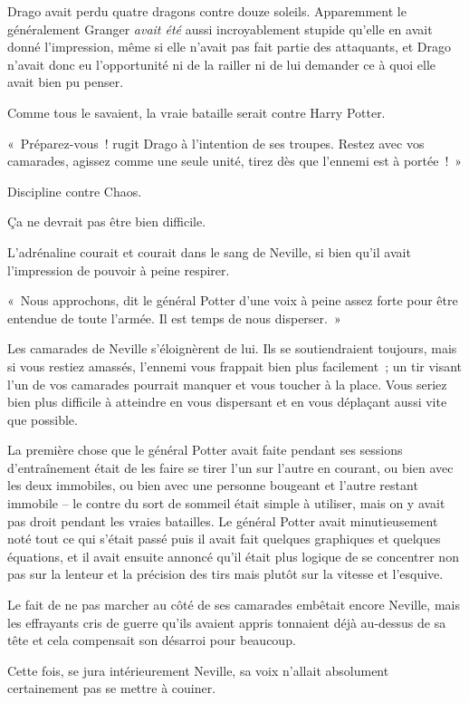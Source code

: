 Drago avait perdu quatre dragons contre douze soleils. Apparemment le généralement Granger \emph{avait été} aussi incroyablement stupide qu'elle en avait donné l'impression, même si elle n'avait pas fait partie des attaquants, et Drago n'avait donc eu l'opportunité ni de la railler ni de lui demander ce à quoi elle avait bien pu penser.

Comme tous le savaient, la vraie bataille serait contre Harry Potter.

«~Préparez-vous~! rugit Drago à l'intention de ses troupes. Restez avec vos camarades, agissez comme une seule unité, tirez dès que l'ennemi est à portée~!~»

Discipline contre Chaos.

Ça ne devrait pas être bien difficile.

\later

L'adrénaline courait et courait dans le sang de Neville, si bien qu'il avait l'impression de pouvoir à peine respirer.

«~Nous approchons, dit le général Potter d'une voix à peine assez forte pour être entendue de toute l'armée. Il est temps de nous disperser.~»

Les camarades de Neville s'éloignèrent de lui. Ils se soutiendraient toujours, mais si vous restiez amassés, l'ennemi vous frappait bien plus facilement~; un tir visant l'un de vos camarades pourrait manquer et vous toucher à la place. Vous seriez bien plus difficile à atteindre en vous dispersant et en vous déplaçant aussi vite que possible.

La première chose que le général Potter avait faite pendant ses sessions d'entraînement était de les faire se tirer l'un sur l'autre en courant, ou bien avec les deux immobiles, ou bien avec une personne bougeant et l'autre restant immobile -- le contre du sort de sommeil était simple à utiliser, mais on y avait pas droit pendant les vraies batailles. Le général Potter avait minutieusement noté tout ce qui s'était passé puis il avait fait quelques graphiques et quelques équations, et il avait ensuite annoncé qu'il était plus logique de se concentrer non pas sur la lenteur et la précision des tirs mais plutôt sur la vitesse et l'esquive.

Le fait de ne pas marcher au côté de ses camarades embêtait encore Neville, mais les effrayants cris de guerre qu'ils avaient appris tonnaient déjà au-dessus de sa tête et cela compensait son désarroi pour beaucoup.

Cette fois, se jura intérieurement Neville, sa voix n'allait absolument certainement pas se mettre à couiner.

